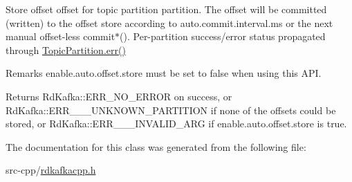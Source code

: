 Store offset {\ttfamily offset} for topic partition {\ttfamily partition}. The offset will be committed (written) to the offset store according to {\ttfamily auto.commit.interval.ms} or the next manual offset-\/less commit$\ast$(). Per-\/partition success/error status propagated through \hyperlink{classRdKafka_1_1TopicPartition_adf4cd4ca1ed51f1829fddd475b96adee}{TopicPartition.err()}

\begin{DoxyRemark}{Remarks}
{\ttfamily enable.auto.offset.store} must be set to {\ttfamily false} when using this API.
\end{DoxyRemark}
\begin{DoxyReturn}{Returns}
RdKafka::ERR\_\-NO\_\-ERROR on success, or RdKafka::ERR\_\-\_\-\_\-UNKNOWN\_\-PARTITION if none of the offsets could be stored, or RdKafka::ERR\_\-\_\-\_\-INVALID\_\-ARG if {\ttfamily enable.auto.offset.store} is true. 
\end{DoxyReturn}


The documentation for this class was generated from the following file:\begin{DoxyCompactItemize}
\item 
src-\/cpp/\hyperlink{rdkafkacpp_8h}{rdkafkacpp.h}\end{DoxyCompactItemize}
